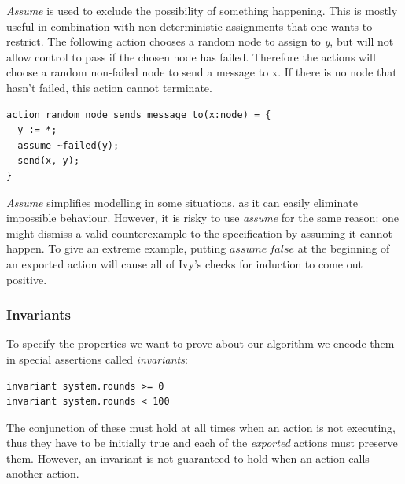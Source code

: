 \documentclass[fleqn]{article}
\begin{document}
\textit{Assume} is used to exclude the possibility of something happening.  This is mostly useful in combination with non-deterministic assignments that one wants to restrict. The following action chooses a random node to assign to \textit{y}, but will not allow control to pass if the chosen node has failed. Therefore the actions will choose a random non-failed node to send a message to x.  If there is no node that hasn't failed, this action cannot terminate.

\begin{mdframed}[nobreak=true, backgroundcolor=light-gray, roundcorner=10pt,leftmargin=1, rightmargin=1, innerleftmargin=15, innertopmargin=15,innerbottommargin=15, outerlinewidth=1, linecolor=light-gray]
\begin{lstlisting}
action random_node_sends_message_to(x:node) = {
  y := *;
  assume ~failed(y);
  send(x, y);
}
\end{lstlisting}
\end{mdframed}

\textit{Assume} simplifies modelling in some situations, as it can easily eliminate impossible behaviour. However,
it is risky to use \textit{assume} for the same reason: one might dismiss a valid counterexample to the specification
by assuming it cannot happen. To give an extreme example, putting $assume\ false$ at the beginning of an exported action will cause all of Ivy's checks for induction to come out positive.


\subsubsection{Invariants}
To specify the properties we want to prove about our algorithm we encode them in special assertions called \textit{invariants}:

\begin{mdframed}[nobreak=true, backgroundcolor=light-gray, roundcorner=10pt,leftmargin=1, rightmargin=1, innerleftmargin=15, innertopmargin=15,innerbottommargin=15, outerlinewidth=1, linecolor=light-gray]
\begin{lstlisting}
invariant system.rounds >= 0
invariant system.rounds < 100
\end{lstlisting}
\end{mdframed}
The conjunction of these must hold at all times when an action is not executing, thus they have to be initially true and each of
the \textit{exported} actions must preserve them. However, an invariant is not guaranteed to hold when an action calls another action.
\end{document}
